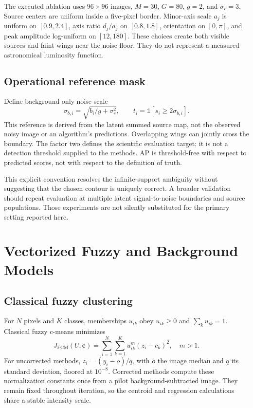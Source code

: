 \documentclass[conference]{IEEEtran}
\begin{document}
The executed ablation uses $96\times96$ images, $M=30$, $G=80$, $g=2$, and $\sigma_r=3$. Source centers are uniform inside a five-pixel border. Minor-axis scale $a_j$ is uniform on $[0.9,2.4]$, axis ratio $d_j/a_j$ on $[0.8,1.8]$, orientation on $[0,\pi]$, and peak amplitude log-uniform on $[12,180]$. These choices create both visible sources and faint wings near the noise floor. They do not represent a measured astronomical luminosity function.

\subsection{Operational reference mask}
Define background-only noise scale
\begin{equation}
 \sigma_{b,i}=\sqrt{b_i/g+\sigma_r^2},\qquad
 t_i=\mathbb 1[s_i\geq2\sigma_{b,i}].\label{eq:truth}
\end{equation}
This reference is derived from the latent summed source map, not the observed noisy image or an algorithm's predictions. Overlapping wings can jointly cross the boundary. The factor two defines the scientific evaluation target; it is not a detection threshold supplied to the methods. AP is threshold-free with respect to predicted scores, not with respect to the definition of truth.

This explicit convention resolves the infinite-support ambiguity without suggesting that the chosen contour is uniquely correct. A broader validation should repeat evaluation at multiple latent signal-to-noise boundaries and source populations. Those experiments are not silently substituted for the primary setting reported here.

\section{Vectorized Fuzzy and Background Models}
\subsection{Classical fuzzy clustering}
For $N$ pixels and $K$ classes, memberships $u_{ik}$ obey $u_{ik}\geq0$ and $\sum_k u_{ik}=1$. Classical fuzzy c-means minimizes
\begin{equation}
 J_{\mathrm{FCM}}(U,\boldsymbol c)=
 \sum_{i=1}^{N}\sum_{k=1}^{K}u_{ik}^{m}(z_i-c_k)^2,
 \quad m>1.\label{eq:fcm}
\end{equation}
For uncorrected methods, $z_i=(y_i-o)/q$, with $o$ the image median and $q$ its standard deviation, floored at $10^{-8}$. Corrected methods compute these normalization constants once from a pilot background-subtracted image. They remain fixed throughout iteration, so the centroid and regression calculations share a stable intensity scale.
\end{document}
